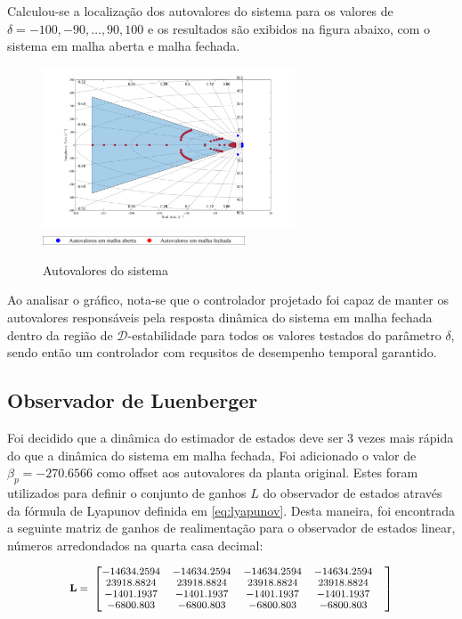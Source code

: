 Calculou-se a localização dos autovalores do sistema para os valores de $\delta = -100, -90, \dots, 90, 100$ e os resultados são exibidos na figura abaixo, com o sistema em malha aberta e malha fechada.
\FloatBarrier
\begin{figure}[htbp]
    \begin{centering}
    \includegraphics[width=7.5cm]{img/regiao_d_estabilidade_autoval.png}
    \includegraphics[width=6cm]{img/regiao_d_estabilidade_autoval_leg.png}
    \caption{Autovalores do sistema}
    \label{fig:regiao_d_estabilidade_autoval_leg}
    \end{centering}
\end{figure}
\FloatBarrier

Ao analisar o gráfico, nota-se que o controlador projetado foi capaz de manter os autovalores responsáveis pela resposta dinâmica do sistema em malha fechada dentro da região de \( \mathcal{D}\)-estabilidade para todos os valores testados do parâmetro $\delta$, sendo então um controlador com requsitos de desempenho temporal garantido.
\subsection{Observador de Luenberger}
Foi decidido que a dinâmica do estimador de estados deve ser 3 vezes  mais rápida do que a dinâmica do sistema em malha fechada, Foi adicionado o valor de $\beta_p=-270.6566$ como offset aos autovalores da planta original.
Estes foram utilizados para definir o conjunto de ganhos $L$ do observador de estados através da fórmula de Lyapunov definida em \eqref{eq:lyapunov}. 
Desta maneira, foi encontrada a seguinte matriz de ganhos de realimentação para o observador de estados linear, números arredondados na quarta casa decimal:

\begin{equation} \label{eq:ganhos_pred} \small
    \begin{split}
        \mathbf{L}=\
    \end{split}
    \begin{bmatrix}
       -14634.2594& -14634.2594& -14634.2594& -14634.2594&\\
        23918.8824&  23918.8824&  23918.8824&  23918.8824&\\
        -1401.1937&  -1401.1937&  -1401.1937&  -1401.1937&\\
        -6800.803 &  -6800.803 &  -6800.803 &  -6800.803 &\\
    \end{bmatrix}
\end{equation}


